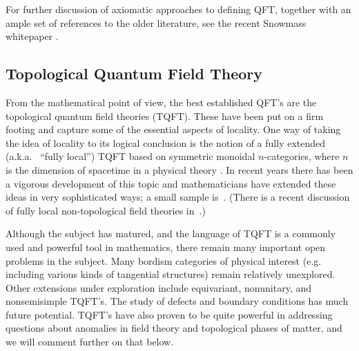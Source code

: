 \documentclass[12pt]{article}
\begin{document}
For further discussion of axiomatic approaches to defining QFT, together 
with an ample set of references to the older literature, see the recent 
Snowmass whitepaper \cite{Dedushenko:2022zwd}. 

\bigskip\bigskip


\subsection{Topological Quantum Field Theory}\label{sec:TQFT}

From the mathematical point of view, the best established QFT's are the
topological quantum field theories (TQFT). These have been put on a firm
footing and capture some of the essential aspects of locality. One way
of taking the idea  of locality  to its logical conclusion  is the
notion of a fully extended (a.k.a.~ ``fully local'')
 TQFT based on symmetric monoidal $n$-categories, where $n$ is the dimension
of spacetime in a physical theory
\cite{FreedHigher,Lawrence,BaezDolan,Lurie,Freed:2012hx,Teleman-Berkeley}.
In recent years there has been a vigorous development of this topic and
mathematicians have extended these ideas in very sophisticated ways; a small
sample is~\cite{AyFr,CaSch}. (There is a recent discussion of fully local non-topological field theories in~\cite{GP}.)


Although the subject has matured, and the language of TQFT is a commonly
used and powerful tool in mathematics, there remain many important open problems in the subject.
Many bordism categories of physical interest (e.g. including various kinds of tangential structures)
remain relatively unexplored. Other extensions under exploration include  equivariant, nonunitary, and nonsemisimple TQFT's.  The study of defects and boundary conditions has much future potential.    TQFT's have
 also proven to be quite powerful in addressing questions about anomalies in field theory
 and topological phases of matter, and we will comment further on that below.
\end{document}
